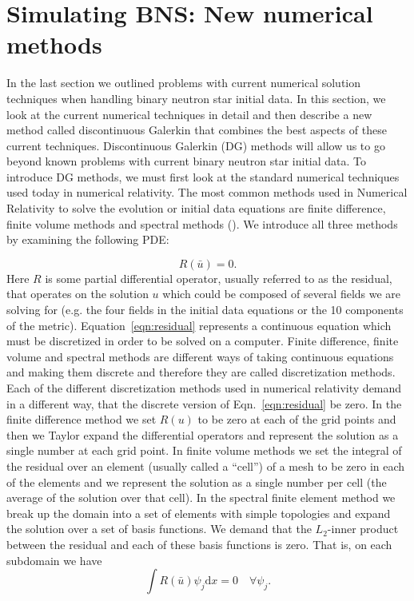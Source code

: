 \section{Simulating BNS: New numerical methods}

In the last section we outlined problems with current numerical solution techniques when handling binary neutron star initial data. In this section, we look at the current numerical techniques in detail and then describe a new method called discontinuous Galerkin that combines the best aspects of these current techniques. Discontinuous Galerkin (DG) methods will allow us to go beyond known problems with current binary neutron star initial data. To introduce DG methods, we must first look at the standard numerical techniques used today in numerical relativity. The most common methods used in Numerical Relativity to solve the evolution or initial data equations are finite difference, finite volume methods and spectral methods (\cite{baumgarte2010numerical}). We introduce all three methods by examining the following PDE:

\begin{equation}
  \label{eqn:residual}
 R(\bar u) = 0.
\end{equation}
%
Here $R$ is some partial differential operator, usually referred to as the residual, that operates on the solution $u$ which could be composed of several fields we are solving for (e.g. the four fields in the initial data equations or the 10 components of the metric). Equation~\ref{eqn:residual} represents a continuous equation which must be discretized in order to be solved on a computer. Finite difference, finite volume and spectral methods are different ways of taking continuous equations and making them discrete and therefore they are called discretization methods. Each of the different discretization methods used in numerical relativity demand in a different way, that the discrete version of Eqn.~\ref{eqn:residual} be zero. In the finite difference method we set $R(u)$ to be zero at each of the grid points and then we Taylor expand the differential operators and represent the solution as a single number at each grid point. In finite volume methods we set the integral of the residual over an element (usually called a ``cell'') of a mesh to be zero in each of the elements and we represent the solution as a single number per cell (the average of the solution over that cell). In the spectral finite element method we break up the domain into a set of elements with simple topologies and expand the solution over a set of basis functions. We demand that the $L_2$-inner product between the residual and each of these basis functions is zero. That is, on each subdomain we have
%
\begin{equation}
  \label{eqn:l2orthog}
 \int R(\bar u)\psi_j  \mathrm{d}x = 0 \quad \forall \psi_j.
\end{equation}
%

